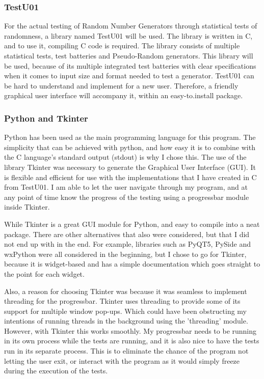 \documentclass[]{final_report}
\begin{document}
\subsubsection*{TestU01}
\par{For the actual testing of Random Number Generators through statistical tests of randomness, a library named TestU01 will be used. The library is written in C, and to use it, compiling C code is required. The library consists of multiple statistical tests, test batteries and Pseudo-Random generators. This library will be used, because of its multiple integrated test batteries with clear specifications when it comes to input size and format needed to test a generator. TestU01 can be hard to understand and implement for a new user. Therefore, a friendly graphical user interface will accompany it, within an easy-to.install package.}

\subsubsection*{Python and Tkinter}
\par{Python has been used as the main programming language for this program. The simplicity that can be achieved with python, and how easy it is to combine with the C language's standard output (stdout) is why I chose this. The use of the library Tkinter was necessary to generate the Graphical User Interface (GUI). It is flexible and efficient for use with the implementations that I have created in C from TestU01. I am able to let the user navigate through my program, and at any point of time know the progress of the testing using a progressbar module inside Tkinter.}

\par{While Tkinter is a great GUI module for Python, and easy to compile into a neat package. There are other alternatives that also were considered, but that I did not end up with in the end. For example, libraries such as PyQT5, PySide and wxPython were all considered in the beginning, but I chose to go for Tkinter, because it is widget-based and has a simple documentation which goes straight to the point for each widget.}

\par{Also, a reason for choosing Tkinter was because it was seamless to implement threading for the progressbar. Tkinter uses threading to provide some of its support for multiple window pop-ups. Which could have been obstructing my intentions of running threads in the background using the 'threading' module. However, with Tkinter this works smoothly. My progressbar needs to be running in its own process while the tests are running, and it is also nice to have the tests run in its separate process. This is to eliminate the chance of the program not letting the user exit, or interact with the program as it would simply freeze during the execution of the tests.}
\end{document}
